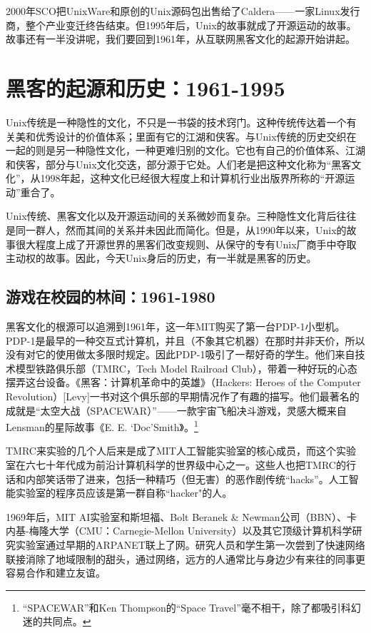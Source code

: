 \documentclass[11pt,oneside]{book}
\begin{document}
\begin{common-format}
2000年SCO把UnixWare和原创的Unix源码包出售给了Caldera——一家Linux发行商，整个产业变迁终告结束。但1995年后，Unix的故事就成了开源运动的故事。故事还有一半没讲呢，我们要回到1961年，从互联网黑客文化的起源开始讲起。

\section{黑客的起源和历史：1961-1995}
Unix传统是一种隐性的文化，不只是一书袋的技术窍门。这种传统传达着一个有关美和优秀设计的价值体系；里面有它的江湖和侠客。与Unix传统的历史交织在一起的则是另一种隐性文化，一种更难归别的文化。它也有自己的价值体系、江湖和侠客，部分与Unix文化交迭，部分源于它处。人们老是把这种文化称为“黑客文化”，从1998年起，这种文化已经很大程度上和计算机行业出版界所称的“开源运动”重合了。

Unix传统、黑客文化以及开源运动间的关系微妙而复杂。三种隐性文化背后往往是同一群人，然而其间的关系并未因此而简化。但是，从1990年以来，Unix的故事很大程度上成了开源世界的黑客们改变规则、从保守的专有Unix厂商手中夺取主动权的故事。因此，今天Unix身后的历史，有一半就是黑客的历史。


\subsection{游戏在校园的林间：1961-1980}
黑客文化的根源可以追溯到1961年，这一年MIT购买了第一台PDP-1小型机。PDP-1是最早的一种交互式计算机，并且（不象其它机器）在那时并非天价，所以没有对它的使用做太多限时规定。因此PDP-1吸引了一帮好奇的学生。他们来自技术模型铁路俱乐部（TMRC，Tech Model Railroad Club），带着一种好玩的心态摆弄这台设备。《黑客：计算机革命中的英雄》（Hackers:  Heroes of the Computer Revolution）[Levy]一书对这个俱乐部的早期情况作了有趣的描写。他们最著名的成就是“太空大战（SPACEWAR）”——一款宇宙飞船决斗游戏，灵感大概来自Lensman的星际故事《E. E. ‘Doc’Smith》。\footnote{“SPACEWAR”和Ken Thompson的“Space Travel”毫不相干，除了都吸引科幻迷的共同点。}

TMRC来实验的几个人后来是成了MIT人工智能实验室的核心成员，而这个实验室在六七十年代成为前沿计算机科学的世界级中心之一。这些人也把TMRC的行话和内部笑话带了进来，包括一种精巧（但无害）的恶作剧传统“hacks”。人工智能实验室的程序员应该是第一群自称“hacker"的人。

1969年后，MIT AI实验室和斯坦福、Bolt Beranek \& Newman公司（BBN）、卡内基-梅隆大学（CMU：Carnegie-Mellon University）以及其它顶级计算机科学研究实验室通过早期的ARPANET联上了网。研究人员和学生第一次尝到了快速网络联接消除了地域限制的甜头，通过网络，远方的人通常比与身边少有来往的同事更容易合作和建立友谊。


\end{common-format}
\end{document}
